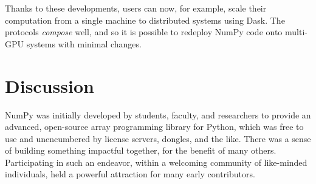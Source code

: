 Thanks to these developments, users can now, for example, scale
their computation from a single machine to distributed systems using Dask. The protocols
\textit{compose} well, and so it is possible to redeploy NumPy code onto multi-GPU systems with minimal changes\cite{entschev2019}.






\section*{Discussion}

NumPy was initially developed by students, faculty, and researchers to
provide an advanced, open-source array programming library for Python,
which was free to use and unencumbered by license servers, dongles, and the like.
There was a sense of building something
impactful together, for the benefit of many others.  Participating in
such an endeavor, within a welcoming community of like-minded
individuals, held a powerful attraction for many early contributors.

